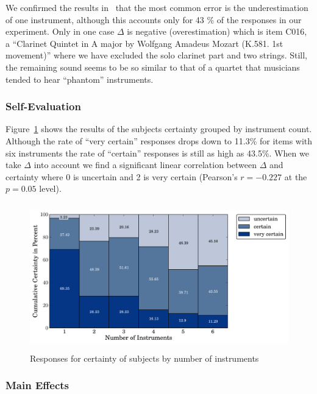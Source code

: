 We confirmed the results in~\cite{huron89} that the most common error is the underestimation of one instrument, although this accounts only for 43 \% of the responses in our experiment. Only in one case $\Delta$ is negative (overestimation) which is item C016, a ``Clarinet Quintet in A major by Wolfgang Amadeus Mozart (K.581. 1st movement)'' where we have excluded the solo clarinet part and two strings. Still, the remaining sound seems to be so similar to that of a quartet that musicians tended to hear ``phantom'' instruments.

\subsubsection*{Self-Evaluation}

Figure~\ref{fig:certainty} shows the results of the subjects certainty grouped by instrument count. Although the rate of ``very certain'' responses drops down to 11.3\% for items with six instruments the rate of ``certain'' responses is still as high as 43.5\%. When we take $\Delta$ into account we find a significant linear correlation between $\Delta$ and certainty where 0 is uncertain and 2 is very certain (Pearson's $r = -0.227$ at the $p=0.05$ level).

\begin{figure}[h]
	\centering
		\includegraphics[height=2.5in]{Chapters/07_Analysis_Experiment/images/certainty.pdf}
	\caption{Responses for certainty of subjects by number of instruments}
	\label{fig:certainty}
\end{figure}

\subsubsection*{Main Effects}

